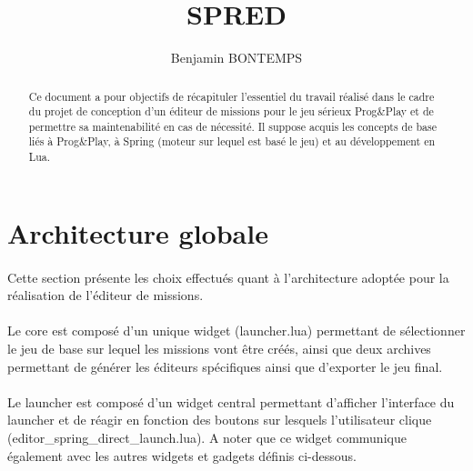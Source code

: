\documentclass[a4paper]{article}
\title{SPRED}
\author{Benjamin BONTEMPS}
\begin{document}
\maketitle

\begin{abstract}
Ce document a pour objectifs de récapituler l'essentiel du travail réalisé dans le cadre du projet de conception d'un éditeur de missions pour le jeu sérieux Prog\&Play et de permettre sa maintenabilité en cas de nécessité. Il suppose acquis les concepts de base liés à Prog\&Play, à Spring (moteur sur lequel est basé le jeu) et au développement en Lua.
\end{abstract}

\tableofcontents

\newpage

\section{Architecture globale}
\paragraph{}
Cette section présente les choix effectués quant à l'architecture adoptée pour la réalisation de l'éditeur de missions.
\paragraph{}
Le core est composé d'un unique widget (launcher.lua) permettant de sélectionner le jeu de base sur lequel les missions vont être créés, ainsi que deux archives permettant de générer les éditeurs spécifiques ainsi que d'exporter le jeu final.
\paragraph{}
Le launcher est composé d'un widget central permettant d'afficher l'interface du launcher et de réagir en fonction des boutons sur lesquels l'utilisateur clique (editor\_spring\_direct\_launch.lua). A noter que ce widget communique également avec les autres widgets et gadgets définis ci-dessous.
\end{document}
